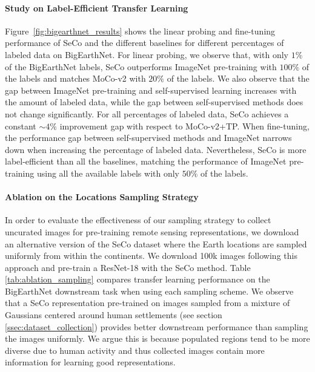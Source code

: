 \documentclass[10pt,twocolumn,letterpaper]{article}
\newcommand{\methodname}[0]{SeCo}
\begin{document}
\vspace{-1em}\paragraph{Study on Label-Efficient Transfer Learning}
Figure~\ref{fig:bigearthnet_results} shows the linear probing and fine-tuning performance of \methodname{} and the different baselines for different percentages of labeled data on BigEarthNet. For linear probing, we observe that, with only $1\%$ of the BigEarthNet labels, \methodname{} outperforms ImageNet pre-training with $100\%$ of the labels and matches MoCo-v2 with $20\%$ of the labels. We also observe that the gap between ImageNet pre-training and self-supervised learning increases with the amount of labeled data, while the gap between self-supervised methods does not change significantly. For all percentages of labeled data, \methodname{} achieves a constant $\sim 4\%$ improvement gap with respect to MoCo-v2+TP. When fine-tuning, the performance gap between self-supervised methods and ImageNet narrows down when increasing the percentage of labeled data. Nevertheless, \methodname{} is more label-efficient than all the baselines, matching the performance of ImageNet pre-training using all the available labels with only $50\%$ of the labels.



\vspace{-1em}\paragraph{Ablation on the Locations Sampling Strategy}
In order to evaluate the effectiveness of our sampling strategy to collect uncurated images for pre-training remote sensing representations, we download an alternative version of the \methodname{} dataset where the Earth locations are sampled uniformly from within the continents. We download 100k images following this approach and pre-train a ResNet-18 with the \methodname{} method. Table \ref{tab:ablation_sampling} compares transfer learning performance on the BigEarthNet downstream task when using each sampling scheme. We observe that a \methodname{} representation pre-trained on images sampled from a mixture of Gaussians centered around human settlements (see section \ref{ssec:dataset_collection}) provides better downstream performance than sampling the images uniformly. We argue this is because populated regions tend to be more diverse due to human activity and thus collected images contain more information for learning good representations.
\end{document}
